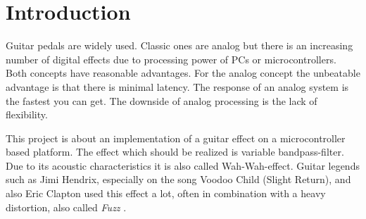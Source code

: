 \section{Introduction}

Guitar pedals are widely used. Classic ones are analog but there is an increasing number of
digital effects due to processing power of PCs or microcontrollers. Both concepts have
reasonable advantages. For the analog concept the unbeatable advantage is that there is
minimal latency. The response of an analog system is the fastest you can get. The downside of analog
processing is the lack of flexibility.

This project is about an implementation of a guitar effect on a microcontroller based platform.
The effect which should be realized is variable bandpass-filter.
Due to its acoustic characteristics it is also called \frqq Wah-Wah\flqq-effect.
Guitar legends such as Jimi Hendrix, especially on the song Voodoo Child (Slight Return),
and also Eric Clapton used this effect a lot, often in combination with a heavy distortion, also called \textit{Fuzz}
\cite{dailey_e_guitar} \cite{wiki_wahwah}.
